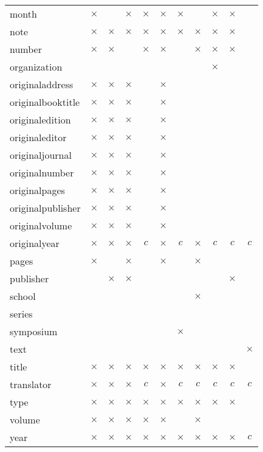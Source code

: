 \documentclass{article}
\newcommand{\X}{\ensuremath{\times}}%
\newcommand{\Y}{\ensuremath{c}}%
\begin{document}
\begin{table}[p]
\begin{center}
{\begin{tabular}{@{}lcccccccccc@{}}
month             &\X&  &\X&\X&\X&\X&  &\X&\X&  \\
note              &\X&\X&\X&\X&\X&\X&\X&\X&\X&  \\
number            &\X&\X&  &\X&\X&  &\X&\X&\X&  \\
organization      &  &  &  &  &  &  &  &\X&  &  \\
originaladdress   &\X&\X&\X&  &\X&  &  &  &  &  \\
originalbooktitle &\X&\X&\X&  &\X&  &  &  &  &  \\
originaledition   &\X&\X&\X&  &\X&  &  &  &  &  \\
originaleditor    &\X&\X&\X&  &\X&  &  &  &  &  \\
originaljournal   &\X&\X&\X&  &\X&  &  &  &  &  \\
originalnumber    &\X&\X&\X&  &\X&  &  &  &  &  \\
originalpages     &\X&\X&\X&  &\X&  &  &  &  &  \\
originalpublisher &\X&\X&\X&  &\X&  &  &  &  &  \\
originalvolume    &\X&\X&\X&  &\X&  &  &  &  &  \\
originalyear      &\X&\X&\X&\Y&\X&\Y&\X&\Y&\Y&\Y\\
pages             &\X&  &\X&  &\X&  &\X&  &  &  \\
publisher         &  &\X&\X&  &  &  &  &  &\X&  \\
school            &  &  &  &  &  &  &\X&  &  &  \\
series            &  &  &  &  &  &  &  &  &  &  \\
symposium         &  &  &  &  &  &\X&  &  &  &  \\
text              &  &  &  &  &  &  &  &  &  &\X\\
title             &\X&\X&\X&\X&\X&\X&\X&\X&\X&  \\
translator        &\X&\X&\X&\Y&\X&\Y&\Y&\Y&\Y&\Y\\
type              &\X&\X&\X&\X&\X&\X&\X&\X&\X&  \\
volume            &\X&\X&\X&\X&\X&  &\X&  &  &  \\
year              &\X&\X&\X&\X&\X&\X&\X&\X&\X&\Y\\
\hline
\end{tabular}%
\setlength{\tabcolsep}{\oldtabcolsep}
}
\end{center}
%
\end{table}
\end{document}
